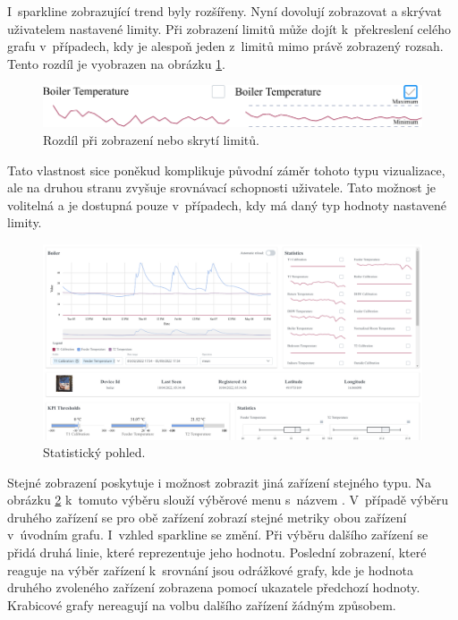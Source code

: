 I~sparkline zobrazující trend byly rozšířeny. Nyní dovolují zobrazovat a skrývat uživatelem nastavené limity. Při zobrazení limitů může dojít k~překreslení celého grafu v~případech, kdy je alespoň jeden z~limitů mimo právě zobrazený rozsah. Tento rozdíl je vyobrazen na obrázku \ref{sparklineDifferences}.

\begin{figure}[H]
\label{sparklineDifferences}
\begin{center}
    \includegraphics[width=\textwidth]{obrazky-figures/sparklineDifferences.pdf}
\end{center}
\caption{Rozdíl při zobrazení nebo skrytí limitů.}
\end{figure}

Tato vlastnost sice poněkud komplikuje původní záměr tohoto typu vizualizace, ale na druhou stranu zvyšuje srovnávací schopnosti uživatele. Tato možnost je volitelná a je dostupná pouze v~případech, kdy má daný typ hodnoty nastavené limity.

\begin{figure}[H]
\label{statistical}
\begin{center}
    \includegraphics[width=\textwidth]{obrazky-figures/dashboard1.pdf}
\end{center}
\caption{Statistický pohled.}
\end{figure}

Stejné zobrazení poskytuje i možnost zobrazit jiná zařízení stejného typu. Na obrázku \ref{statistical} k~tomuto výběru slouží výběrové menu s~názvem . V~případě výběru druhého zařízení se pro obě zařízení zobrazí stejné metriky obou zařízení v~úvodním grafu. I~vzhled sparkline se změní. Při výběru dalšího zařízení se přidá druhá linie, které reprezentuje jeho hodnotu. Poslední zobrazení, které reaguje na výběr zařízení k~srovnání jsou odrážkové grafy, kde je hodnota druhého zvoleného zařízení zobrazena pomocí ukazatele předchozí hodnoty. Krabicové grafy nereagují na volbu dalšího zařízení žádným způsobem.

